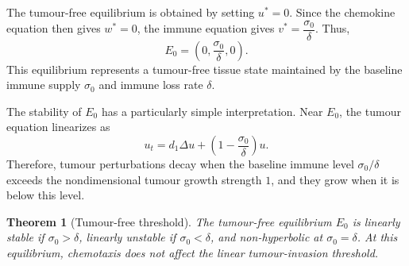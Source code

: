 \documentclass[a4paper,fleqn,longmktitle]{cas-sc}
\theoremstyle{plain}
\newtheorem{theorem}{Theorem}[section]
\theoremstyle{definition}
\numberwithin{equation}{section}
\begin{document}
The tumour-free equilibrium is obtained by setting $u^*=0$. Since the chemokine
equation then gives $w^*=0$, the immune equation gives $v^*=\dfrac{\sigma_0}{\delta}$.
Thus,
\begin{equation}\label{eq:tumour-free-equilibrium}
E_0=\left(0,\frac{\sigma_0}{\delta},0\right).
\end{equation}
This equilibrium represents a tumour-free tissue state maintained by the
baseline immune supply $\sigma_0$ and immune loss rate $\delta$.

The stability of $E_0$ has a particularly simple interpretation. Near
$E_0$, the tumour equation linearizes as
\[
u_t=d_1\Delta u+\left(1-\frac{\sigma_0}{\delta}\right)u .
\]
Therefore, tumour perturbations decay when the baseline immune level
$\sigma_0/\delta$ exceeds the nondimensional tumour growth strength $1$, and
they grow when it is below this level.

\begin{theorem}[Tumour-free threshold]
\label{thm:tumour-free-threshold}
The tumour-free equilibrium $E_0$
is linearly stable if $\sigma_0>\delta$,
linearly unstable if $\sigma_0<\delta$,
and non-hyperbolic at $\sigma_0=\delta$.
At this equilibrium, chemotaxis does not affect the linear tumour-invasion
threshold.
\end{theorem}
\end{document}
